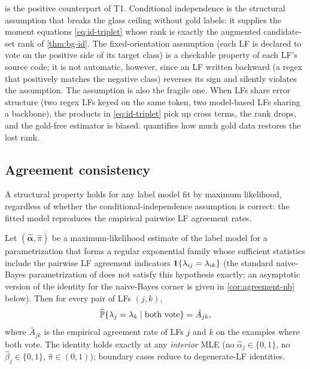  is the positive counterpart of T1.
Conditional independence is the structural assumption that breaks the
glass ceiling without gold labels: it supplies the moment equations
\eqref{eq:id-triplet} whose rank is exactly the augmented
candidate-set rank of \cref{thm:bg-id}. The fixed-orientation
assumption (each LF is declared to vote on the positive side of its
target class) is a checkable property of each LF's source code; it
is not automatic, however, since an LF written backward (a regex
that positively matches the negative class) reverses its sign and
silently violates the assumption. The assumption is also the
fragile one. When LFs share error structure (two regex LFs keyed on
the same token, two model-based LFs sharing a backbone), the products
in \eqref{eq:id-triplet} pick up cross terms, the rank drops, and the
gold-free estimator is biased.  quantifies how
much gold data restores the lost rank.

\subsection{Agreement consistency}

A structural property holds for any label model fit by maximum
likelihood, regardless of whether the conditional-independence
assumption is correct: the fitted model reproduces the empirical
pairwise LF agreement rates.

\begin{theorem}
\label{thm:agreement-consistency}
Let $(\hat{\bm{\alpha}}, \hat{\pi})$ be a maximum-likelihood estimate
of the label model for a parametrization that forms a regular
exponential family whose sufficient statistics include the pairwise
LF agreement indicators $\mathbf{1}\{\lambda_{ij} = \lambda_{ik}\}$ (the
standard naive-Bayes parametrization of \citet{ratner2016data} does
not satisfy this hypothesis exactly; an asymptotic version of the
identity for the naive-Bayes corner is given in
\cref{cor:agreement-nb} below). Then for
every pair of LFs $(j, k)$,
\begin{equation}
  \widehat{\mathbb{P}}\{\lambda_j = \lambda_k \mid \text{both vote}\}
  = \bar{A}_{jk},
  \label{eq:agreement}
\end{equation}
where $\bar{A}_{jk}$ is the empirical agreement rate of LFs $j$ and
$k$ on the examples where both vote. The identity holds exactly at
any \emph{interior} MLE (no $\hat\alpha_j \in \{0,1\}$, no
$\hat\beta_j \in \{0,1\}$, $\hat\pi \in (0,1)$); boundary cases
reduce to degenerate-LF identities.
\end{theorem}

